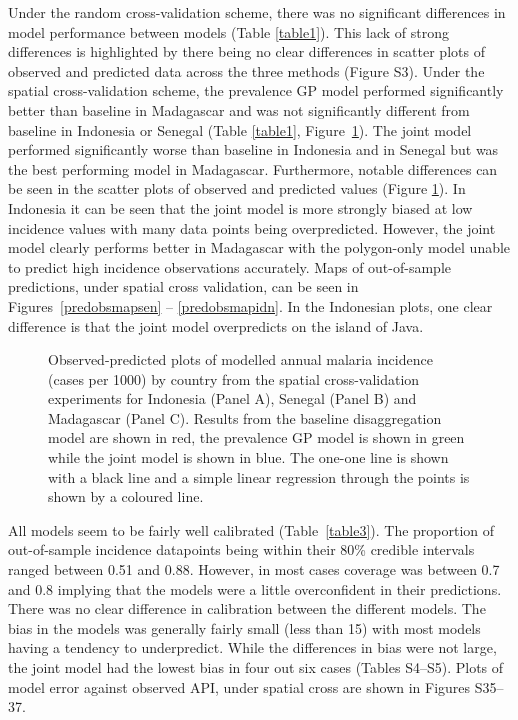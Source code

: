 \documentclass{statsoc}
\begin{document}
Under the random cross-validation scheme, there was no significant differences in model performance between models (Table \ref{table1}).
This lack of strong differences is highlighted by there being no clear differences in scatter plots of observed and predicted data across the three methods (Figure S3).
Under the spatial cross-validation scheme, the prevalence GP model performed significantly better than baseline in Madagascar and was not significantly different from baseline in Indonesia or Senegal (Table \ref{table1}, Figure~\ref{spatial2predobspolyfacet}).
The joint model performed significantly worse than baseline in Indonesia and in Senegal but was the best performing model in Madagascar.
Furthermore, notable differences can be seen in the scatter plots of observed and predicted values (Figure \ref{spatial2predobspolyfacet}).
In Indonesia it can be seen that the joint model is more strongly biased at low incidence values with many data points being overpredicted.
However, the joint model clearly performs better in Madagascar with the polygon-only model unable to predict high incidence observations accurately.
Maps of out-of-sample predictions, under spatial cross validation, can be seen in Figures~\ref{predobsmapsen} -- \ref{predobsmapidn}.
In the Indonesian plots, one clear difference is that the joint model overpredicts on the island of Java. 


\begin{figure}
\caption{\label{spatial2predobspolyfacet} 
Observed-predicted plots of modelled annual malaria incidence (cases per 1000) by country from the spatial cross-validation experiments for Indonesia (Panel A), Senegal (Panel B) and Madagascar (Panel C). 
Results from the baseline disaggregation model are shown in red, the prevalence GP model is shown in green while the joint model is shown in blue.
The one-one line is shown with a black line and a simple linear regression through the points is shown by a coloured line.
}

\end{figure}



All models seem to be fairly well calibrated (Table~\ref{table3}).
The proportion of out-of-sample incidence datapoints being within their 80\% credible intervals ranged between 0.51 and 0.88.
However, in most cases coverage was between 0.7 and 0.8 implying that the models were a little overconfident in their predictions.
There was no clear difference in calibration between the different models.
The bias in the models was generally fairly small (less than 15) with most models having a tendency to underpredict.
While the differences in bias were not large, the joint model had the lowest bias in four out six cases (Tables S4--S5).
Plots of model error against observed API, under spatial cross are shown in Figures S35--37.
\end{document}
